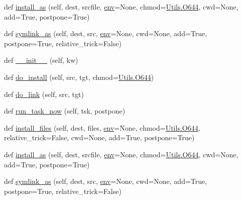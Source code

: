 \begin{DoxyCompactItemize}
\item 
def \hyperlink{classwaflib_1_1_build_1_1_install_context_a7a653c97bec879bfd813d525c8c0caf3}{install\+\_\+as} (self, dest, srcfile, \hyperlink{classwaflib_1_1_build_1_1_build_context_ac3b464a969bc6c898c739b6d820b2219}{env}=None, chmod=\hyperlink{namespacewaflib_1_1_utils_ade9dd27fadbf52a0641bbff06d3dd3ac}{Utils.\+O644}, cwd=None, add=True, postpone=True)
\item 
def \hyperlink{classwaflib_1_1_build_1_1_install_context_a25a3977cdde84cb8b06ce8316acc686b}{symlink\+\_\+as} (self, dest, src, \hyperlink{classwaflib_1_1_build_1_1_build_context_ac3b464a969bc6c898c739b6d820b2219}{env}=None, cwd=None, add=True, postpone=True, relative\+\_\+trick=False)
\item 
def \hyperlink{classwaflib_1_1_build_1_1_install_context_a92d1f07459687e8da5a0e871eeb462f0}{\+\_\+\+\_\+init\+\_\+\+\_\+} (self, kw)
\item 
def \hyperlink{classwaflib_1_1_build_1_1_install_context_a389ce541ae521e6e4e616cfddf89bd7e}{do\+\_\+install} (self, src, tgt, chmod=\hyperlink{namespacewaflib_1_1_utils_ade9dd27fadbf52a0641bbff06d3dd3ac}{Utils.\+O644})
\item 
def \hyperlink{classwaflib_1_1_build_1_1_install_context_ac012afc7dd8fb657141d28ad571392f4}{do\+\_\+link} (self, src, tgt)
\item 
def \hyperlink{classwaflib_1_1_build_1_1_install_context_ab9691686f803c54151ec5bbc92717a0f}{run\+\_\+task\+\_\+now} (self, tsk, postpone)
\item 
def \hyperlink{classwaflib_1_1_build_1_1_install_context_af07f1f67998c0f4a6d20361cd28ee0bc}{install\+\_\+files} (self, dest, files, \hyperlink{classwaflib_1_1_build_1_1_build_context_ac3b464a969bc6c898c739b6d820b2219}{env}=None, chmod=\hyperlink{namespacewaflib_1_1_utils_ade9dd27fadbf52a0641bbff06d3dd3ac}{Utils.\+O644}, relative\+\_\+trick=False, cwd=None, add=True, postpone=True)
\item 
def \hyperlink{classwaflib_1_1_build_1_1_install_context_a7a653c97bec879bfd813d525c8c0caf3}{install\+\_\+as} (self, dest, srcfile, \hyperlink{classwaflib_1_1_build_1_1_build_context_ac3b464a969bc6c898c739b6d820b2219}{env}=None, chmod=\hyperlink{namespacewaflib_1_1_utils_ade9dd27fadbf52a0641bbff06d3dd3ac}{Utils.\+O644}, cwd=None, add=True, postpone=True)
\item 
def \hyperlink{classwaflib_1_1_build_1_1_install_context_a25a3977cdde84cb8b06ce8316acc686b}{symlink\+\_\+as} (self, dest, src, \hyperlink{classwaflib_1_1_build_1_1_build_context_ac3b464a969bc6c898c739b6d820b2219}{env}=None, cwd=None, add=True, postpone=True, relative\+\_\+trick=False)

\end{DoxyCompactItemize}
